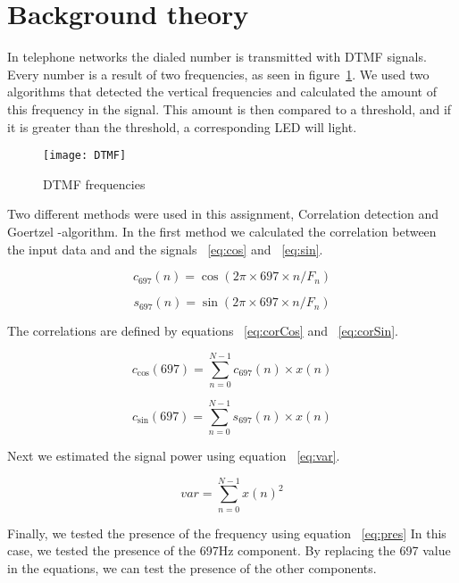 \section{Background theory}
In telephone networks the dialed number is transmitted  with DTMF signals. Every number is  a result of two frequencies, as seen in  figure~\ref{fig:DTMF}. We used two algorithms that detected the vertical frequencies and calculated the amount of this frequency in the signal. This amount is then compared to a threshold, and if it is greater than the threshold, a corresponding LED will light.

\begin{figure}[H]
  \centering
  \texttt{[image: DTMF]}
  \caption{DTMF frequencies ~\cite{DTMF}}
\label{fig:DTMF}
\end{figure}

 Two different methods were used in this assignment, Correlation detection and Goertzel -algorithm. In the first method we calculated the correlation between the input data and and the signals ~\ref{eq:cos} and ~\ref{eq:sin}.

\begin{equation}
  \label{eq:cos}
  c_{697}(n) = \cos(2 \pi \times 697 \times n/F_{n})
\end{equation}

\begin{equation}
  \label{eq:sin}
  s_{697}(n) = \sin(2 \pi \times 697 \times n/F_{n})
\end{equation}

The correlations are defined by equations ~\ref{eq:corCos} and ~\ref{eq:corSin}.

\begin{equation}
  \label{eq:corCos}
  c_{\cos}(697) =\sum_{n=0}^{N-1} c_{697}(n)  \times x(n)
\end{equation}

\begin{equation}
  \label{eq:corSin}
  c_{\sin}(697) =\sum_{n=0}^{N-1} s_{697}(n)  \times x(n)
\end{equation}

Next we estimated the signal power using equation ~\ref{eq:var}.

\begin{equation}
  \label{eq:var}
  var =\sum_{n=0}^{N-1}x(n)^2
\end{equation}

Finally, we tested the presence of the frequency using equation ~\ref{eq:pres} In this case, we tested the presence of the 697Hz component. By replacing the 697 value in the equations, we can test the presence of the other components.

